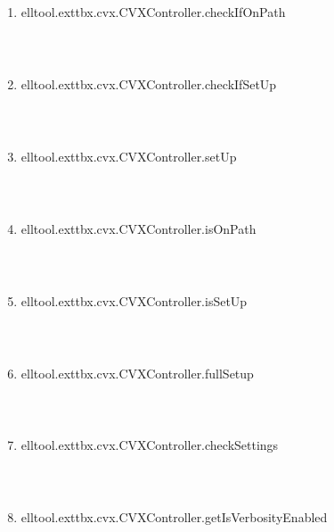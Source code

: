 \begin{enumerate}
\begin{lstlisting}
\end{lstlisting}
\fontfamily{\familydefault}
\selectfont
\item {elltool.exttbx.cvx.CVXController.checkIfOnPath}
\selectfont
\begin{lstlisting}



\end{lstlisting}
\fontfamily{\familydefault}
\selectfont
\item {elltool.exttbx.cvx.CVXController.checkIfSetUp}
\selectfont
\begin{lstlisting}



\end{lstlisting}
\fontfamily{\familydefault}
\selectfont
\item {elltool.exttbx.cvx.CVXController.setUp}
\selectfont
\begin{lstlisting}



\end{lstlisting}
\fontfamily{\familydefault}
\selectfont
\item {elltool.exttbx.cvx.CVXController.isOnPath}
\selectfont
\begin{lstlisting}



\end{lstlisting}
\fontfamily{\familydefault}
\selectfont
\item {elltool.exttbx.cvx.CVXController.isSetUp}
\selectfont
\begin{lstlisting}



\end{lstlisting}
\fontfamily{\familydefault}
\selectfont
\item {elltool.exttbx.cvx.CVXController.fullSetup}
\selectfont
\begin{lstlisting}



\end{lstlisting}
\fontfamily{\familydefault}
\selectfont
\item {elltool.exttbx.cvx.CVXController.checkSettings}
\selectfont
\begin{lstlisting}



\end{lstlisting}
\fontfamily{\familydefault}
\selectfont
\item {elltool.exttbx.cvx.CVXController.getIsVerbosityEnabled}
\selectfont
\begin{lstlisting}




\end{lstlisting}
\end{enumerate}
